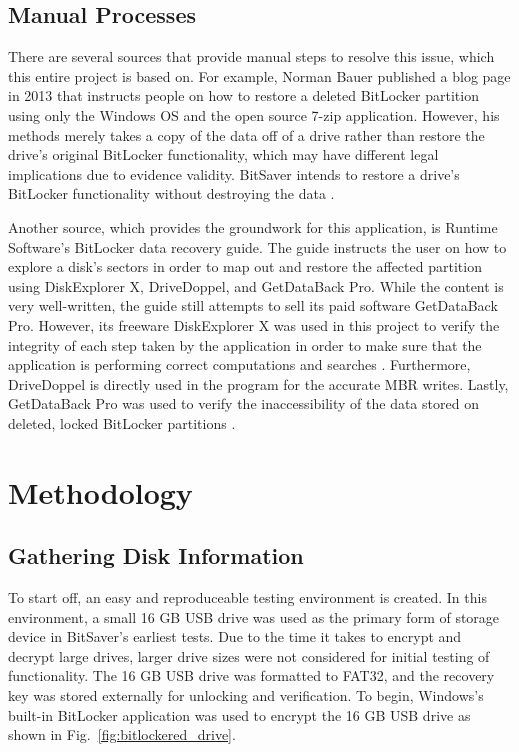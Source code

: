 \documentclass[conference]{IEEEtran} \IEEEoverridecommandlockouts
\begin{document}
\subsection{Manual Processes}

There are several sources that provide manual steps to resolve this issue, which
this entire project is based on. For example, Norman Bauer published a blog
page in 2013 that instructs people on how to restore a deleted BitLocker partition using
only the Windows OS and the open source 7-zip application. However, his methods
merely takes a copy of the data off of a drive rather than
restore the drive's original BitLocker functionality, which may have different legal
implications due to evidence validity. BitSaver intends to restore a drive's
BitLocker functionality without destroying the data \cite{b2}.

Another source, which provides the groundwork for this application, is Runtime
Software's BitLocker data recovery guide. The guide instructs the user on how to
explore a disk's sectors in order to map out and restore the affected partition 
using DiskExplorer X, DriveDoppel, and GetDataBack Pro.
While the content is very well-written, the guide still attempts to sell its
paid software GetDataBack Pro. However, its freeware DiskExplorer X was used in
this project to verify the integrity of each step taken by the application in
order to make sure that the application is performing correct computations and searches \cite{b6}.
Furthermore, DriveDoppel is directly used in the program for the accurate MBR
writes. Lastly, GetDataBack Pro was used to verify the inaccessibility of
the data stored on deleted, locked BitLocker partitions \cite{b1}.

\section{Methodology} 

\subsection{Gathering Disk Information} 

To start off, an easy and
reproduceable testing environment is created. In this environment, a small 16 GB USB drive was
used as the primary form of storage device in BitSaver's earliest tests. Due to the time it
takes to encrypt and decrypt large drives, larger drive sizes were not
considered for initial testing of functionality. The 16 GB USB drive was formatted to FAT32, and the
recovery key was stored externally for unlocking and verification. To begin, Windows's built-in
BitLocker application was used to encrypt the 16 GB USB drive as shown in
Fig.~\ref{fig:bitlockered_drive}.
\end{document}
